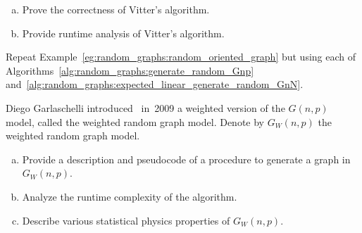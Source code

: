 \begin{problem}
\begin{enumerate}[(a)]
  \item Prove the correctness of Vitter's algorithm.

  \item Provide runtime analysis of Vitter's algorithm.
  \end{enumerate}

\item Repeat Example~\ref{eg:random_graphs:random_oriented_graph} but
  using each of Algorithms~\ref{alg:random_graphs:generate_random_Gnp}
  and~\ref{alg:random_graphs:expected_linear_generate_random_GnN}.

\item Diego Garlaschelli
  introduced~\cite{Garlaschelli2009} in~2009 a weighted version of the
  $G(n,p)$ model, called the weighted
  random graph model. Denote by $G_W(n,p)$ the weighted random graph
  model.
  \begin{enumerate}[(a)]
  \item Provide a description and pseudocode of a procedure to
    generate a graph in $G_W(n,p)$.

  \item Analyze the runtime complexity of the algorithm.

  \item Describe various statistical physics properties of $G_W(n,p)$.
  \end{enumerate}
\end{problem}
